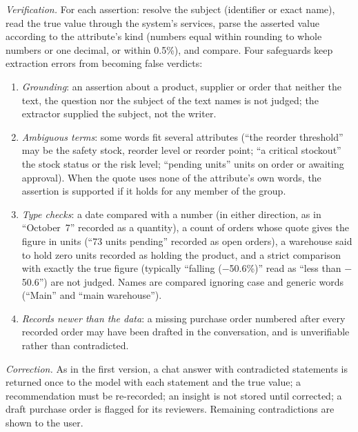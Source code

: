 \documentclass[journal]{IEEEtran}
\renewcommand{\paragraph}[1]{\par\textit{#1}\enspace}
\begin{document}
\paragraph{Verification.} For each assertion: resolve the subject (identifier or exact name), read the true
value through the system's services, parse the asserted value according to the attribute's kind (numbers
equal within rounding to whole numbers or one decimal, or within 0.5\%), and compare. Four safeguards keep
extraction errors from becoming false verdicts:
\begin{enumerate}
\item \emph{Grounding}: an assertion about a product, supplier or order that neither the text, the question
nor the subject of the text names is not judged; the extractor supplied the subject, not the writer.
\item \emph{Ambiguous terms}: some words fit several attributes (``the reorder threshold'' may be the
safety stock, reorder level or reorder point; ``a critical stockout'' the stock status or the risk level;
``pending units'' units on order or awaiting approval). When the quote uses none of the attribute's own
words, the assertion is supported if it holds for any member of the group.
\item \emph{Type checks}: a date compared with a number (in either direction, as in ``October~7'' recorded as
a quantity), a count of orders whose quote gives the figure in units (``73 units pending'' recorded as open
orders), a warehouse said to hold zero units recorded as holding the product, and a strict comparison with
exactly the true figure (typically ``falling ($-$50.6\%)'' read as ``less than $-$50.6'') are not judged.
Names are compared ignoring case and generic words (``Main'' and ``main warehouse'').
\item \emph{Records newer than the data}: a missing purchase order numbered after every recorded order may
have been drafted in the conversation, and is unverifiable rather than contradicted.
\end{enumerate}

\paragraph{Correction.} As in the first version, a chat answer with contradicted statements is returned
once to the model with each statement and the true value; a recommendation must be re-recorded; an insight
is not stored until corrected; a draft purchase order is flagged for its reviewers. Remaining
contradictions are shown to the user.
\end{document}
